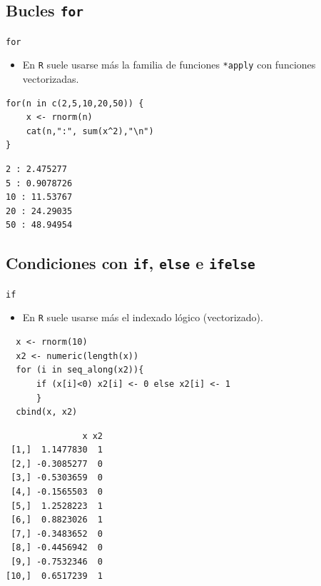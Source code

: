 \documentclass[xcolor={usenames,svgnames,dvipsnames}]{beamer}
\begin{document}
\subsection{Bucles \texttt{for}}
\label{sec-4-3}
\begin{frame}[fragile,label=sec-4-3-1]{\texttt{for}}
 \begin{itemize}
\item En \texttt{R} suele usarse más la familia de funciones \texttt{*apply} con funciones vectorizadas.
\end{itemize}
\lstset{language=R,label= ,caption= ,numbers=none}
\begin{lstlisting}
for(n in c(2,5,10,20,50)) {
    x <- rnorm(n)
    cat(n,":", sum(x^2),"\n")
}
\end{lstlisting}

\begin{verbatim}
2 : 2.475277 
5 : 0.9078726 
10 : 11.53767 
20 : 24.29035 
50 : 48.94954
\end{verbatim}
\end{frame}

\subsection{Condiciones con \texttt{if}, \texttt{else} e \texttt{ifelse}}
\label{sec-4-4}
\begin{frame}[fragile,label=sec-4-4-1]{\texttt{if}}
 \begin{itemize}
\item En \texttt{R} suele usarse más el indexado lógico (vectorizado).
\end{itemize}
\lstset{language=R,label= ,caption= ,numbers=none}
\begin{lstlisting}
  x <- rnorm(10)
  x2 <- numeric(length(x))
  for (i in seq_along(x2)){
      if (x[i]<0) x2[i] <- 0 else x2[i] <- 1
      }
  cbind(x, x2)
\end{lstlisting}

\begin{verbatim}
               x x2
 [1,]  1.1477830  1
 [2,] -0.3085277  0
 [3,] -0.5303659  0
 [4,] -0.1565503  0
 [5,]  1.2528223  1
 [6,]  0.8823026  1
 [7,] -0.3483652  0
 [8,] -0.4456942  0
 [9,] -0.7532346  0
[10,]  0.6517239  1
\end{verbatim}
\end{frame}
\end{document}
